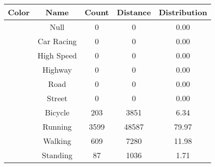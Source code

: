 \begin{longtable*}{|c|c|c|c|c|}\hline
{}
Color&Name&Count&Distance&Distribution\\\hline\hline
{} &Null&0&0&0.00\\\hline
{} &Car Racing&0&0&0.00\\\hline
{} &High Speed&0&0&0.00\\\hline
{} &Highway&0&0&0.00\\\hline
{} &Road&0&0&0.00\\\hline
{} &Street&0&0&0.00\\\hline
{} &Bicycle&203&3851&6.34\\\hline
{} &Running&3599&48587&79.97\\\hline
{} &Walking&609&7280&11.98\\\hline
{} &Standing&87&1036&1.71\\\hline
\end{longtable*}
